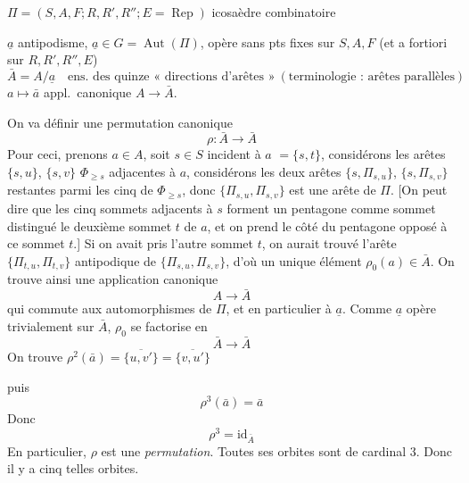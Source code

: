 \documentclass[11pt,a4paper]{article}
\begin{document}

$\Pi = (S, A, F ; R, R', R'' ; E = \operatorname{Rep})$ icosaèdre
combinatoire

$\underline{a}$ antipodisme, $\underline{a} \in G = \operatorname{Aut}(\Pi)$,
opère sans pts fixes sur $S, A, F$ (et a fortiori sur $R, R', R'', E$)
\[
  \bar A = A/\underline{a} \quad \text{ens.\ des quinze « directions
  d'arêtes »} \ (\text{terminologie : arêtes parallèles})
\]
$a \mapsto \bar a$ appl.\ canonique $A \to \bar A$.

On va définir une permutation canonique
\[
  \rho : \bar A \longrightarrow \bar A
\]
Pour ceci, prenons $a \in A$, soit $s \in S$ incident à $a$ $= \{s, t\}$,
considérons les  arêtes $\{s, u\}$, $\{s, v\}$ 
$\Phi_{\geq s}$ adjacentes à $a$, considérons les deux arêtes
$\{s, \Pi_{s,u}\}$, $\{s, \Pi_{s,v}\}$ restantes parmi les cinq de
$\Phi_{\geq s}$, donc $\{\Pi_{s,u}, \Pi_{s,v}\}$ est une arête de $\Pi$.
[On peut dire que les cinq sommets adjacents à $s$ forment un pentagone
 comme sommet distingué le
deuxième sommet $t$ de $a$, et on prend le côté du pentagone opposé à ce
sommet $t$.] Si on avait pris l'autre sommet $t$, on aurait trouvé l'arête
$\{\Pi_{t,u}, \Pi_{t,v}\}$ antipodique de $\{\Pi_{s,u}, \Pi_{s,v}\}$, d'où un
unique élément $\rho_0(a) \in \bar A$. On trouve ainsi une
application canonique
\[
  A \longrightarrow \bar A
\]
qui commute aux automorphismes de $\Pi$, et en particulier à
$\underline{a}$. Comme $\underline{a}$ opère trivialement sur $\bar A$,
$\rho_0$ se factorise en
\[
  \bar A \longrightarrow \bar A
\]
On trouve $\rho^2(\bar a) = \overline{\{u, v'\}} = \overline{\{v, u'\}}$

puis
\[
  \rho^3(\bar a) = \bar a
\]
Donc
\[
  \rho^3 = \mathrm{id}_{\bar A}
\]
En particulier, $\rho$ est une \emph{permutation}. Toutes ses orbites sont
de cardinal 3. Donc il y a cinq telles orbites.
\end{document}

